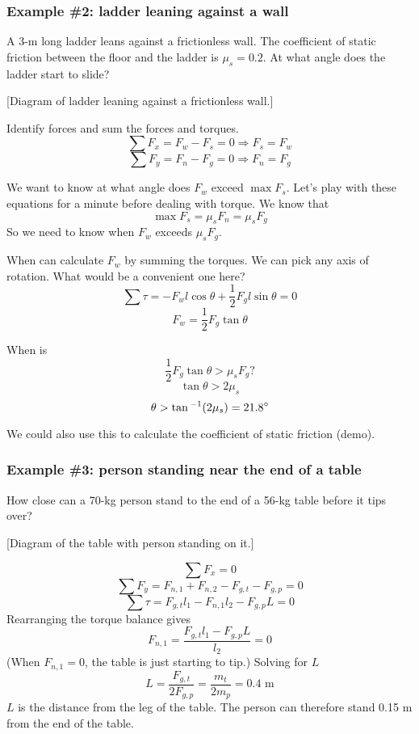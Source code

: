 \subsubsection*{Example \#2: ladder leaning against a wall}
A 3-m long ladder leans against a frictionless wall. The coefficient of static friction between the floor and the ladder is $\mu_s=0.2$. At what angle does the ladder start to slide?

[Diagram of ladder leaning against a frictionless wall.]
\vspace{5cm}

Identify forces and sum the forces and torques.
$$\sum F_x = F_w-F_s=0 \Rightarrow F_s=F_w$$
$$\sum F_y = F_n - F_g=0 \Rightarrow F_n=F_g$$

We want to know at what angle does $F_w$ exceed $\max F_s$. Let's play with these equations for a minute before dealing with torque. We know that
$$\max F_s=\mu_sF_n=\mu_sF_g$$
So we need to know when $F_w$ exceeds $\mu_sF_g$.

When can calculate $F_w$ by summing the torques. We can pick any axis of rotation. What would be a convenient one here?
$$\sum \tau=-F_wl\cos\theta+\frac{1}{2}F_gl\sin\theta=0$$
$$F_w=\frac{1}{2}F_g\tan\theta$$

When is
$$\frac{1}{2}F_g\tan\theta > \mu_s F_g?$$
$$\tan\theta > 2\mu_s$$
$$\theta > \tan\displaystyle^{-1}(2\mu_s)=21.8^\circ$$

We could also use this to calculate the coefficient of static friction (demo).




\subsubsection*{Example \#3: person standing near the end of a table}
How close can a 70-kg person stand to the end of a 56-kg table before it tips over?

[Diagram of the table with person standing on it.]
\vspace{4cm}

$$\sum F_x = 0$$
$$\sum F_y = F_{n,1}+F_{n,2}-F_{g,t}-F_{g,p}=0$$
$$\sum \tau = F_{g,t}l_1-F_{n,1}l_2-F_{g,p}L=0$$
Rearranging the torque balance gives
$$F_{n,1}=\frac{F_{g,t}l_1-F_{g,p}L}{l_2}=0$$
(When $F_{n,1}=0$, the table is just starting to tip.) Solving for $L$
$$L=\frac{F_{g,t}}{2F_{g,p}}=\frac{m_t}{2m_p}=0.4\mbox{ m}$$
$L$ is the distance from the leg of the table. The person can therefore stand 0.15 m from the end of the table.



\clearpage
